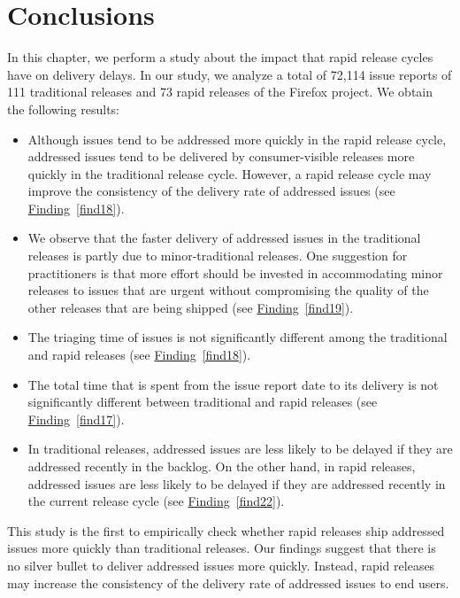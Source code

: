 \section{Conclusions} \label{sec:conclusion}

In this chapter, we perform a study about the impact that
rapid release cycles have on delivery delays. In our study, we analyze
a total of 72,114 issue reports of 111 traditional releases and 73 rapid
releases of the Firefox project. We obtain the following results:

\begin{itemize}

	\item Although issues tend to be addressed more quickly in the rapid
		release cycle, addressed issues tend to be delivered by 
		consumer-visible releases more quickly in the traditional
		release cycle. However, a rapid release cycle may improve the
		consistency of the delivery rate of addressed issues (see
		\hyperref[find18]{Finding}~\ref{find18}).
	
	\item We observe that the faster delivery of addressed issues in the
		traditional releases is partly due to minor-traditional
		releases. One suggestion for practitioners is that more effort
		should be invested in accommodating minor releases to issues
		that are urgent without compromising the quality of the other
		releases that are being shipped (see
		\hyperref[find19]{Finding}~\ref{find19}).

	\item The triaging time of issues is not significantly different among
		the traditional and rapid releases (see
		\hyperref[find18]{Finding}~\ref{find18}).

	\item The total time that is spent from the issue report date to its
		delivery is not significantly different
		between traditional and rapid releases (see
		\hyperref[find17]{Finding}~\ref{find17}).

	\item In traditional releases, addressed issues are less likely to be
		delayed if they are addressed recently in the backlog. On the
		other hand, in rapid releases, addressed issues are less likely
		to be delayed if they are addressed recently in the current
		release cycle (see \hyperref[find22]{Finding}~\ref{find22}). 

\end{itemize}

This study is the first to empirically check whether rapid releases ship
addressed issues more quickly than traditional releases. Our findings suggest
that there is no silver bullet to deliver addressed issues more quickly.
Instead, rapid releases may increase the consistency of the delivery rate of
addressed issues to end users.


